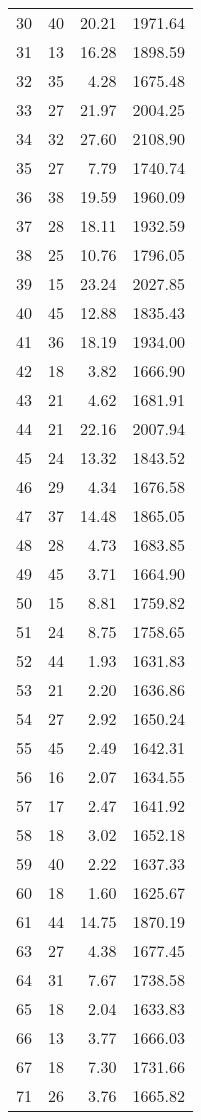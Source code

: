 \begin{appendix}
\begin{longtable}{rrrr}
30 & 40 & 20.21 & 1971.64 \\
31 & 13 & 16.28 & 1898.59 \\
32 & 35 & 4.28 & 1675.48 \\
33 & 27 & 21.97 & 2004.25 \\
34 & 32 & 27.60 & 2108.90 \\
35 & 27 & 7.79 & 1740.74 \\
36 & 38 & 19.59 & 1960.09 \\
37 & 28 & 18.11 & 1932.59 \\
38 & 25 & 10.76 & 1796.05 \\
39 & 15 & 23.24 & 2027.85 \\
40 & 45 & 12.88 & 1835.43 \\
41 & 36 & 18.19 & 1934.00 \\
42 & 18 & 3.82 & 1666.90 \\
43 & 21 & 4.62 & 1681.91 \\
44 & 21 & 22.16 & 2007.94 \\
45 & 24 & 13.32 & 1843.52 \\
46 & 29 & 4.34 & 1676.58 \\
47 & 37 & 14.48 & 1865.05 \\
48 & 28 & 4.73 & 1683.85 \\
49 & 45 & 3.71 & 1664.90 \\
50 & 15 & 8.81 & 1759.82 \\
51 & 24 & 8.75 & 1758.65 \\
52 & 44 & 1.93 & 1631.83 \\
53 & 21 & 2.20 & 1636.86 \\
54 & 27 & 2.92 & 1650.24 \\
55 & 45 & 2.49 & 1642.31 \\
56 & 16 & 2.07 & 1634.55 \\
57 & 17 & 2.47 & 1641.92 \\
58 & 18 & 3.02 & 1652.18 \\
59 & 40 & 2.22 & 1637.33 \\
60 & 18 & 1.60 & 1625.67 \\
61 & 44 & 14.75 & 1870.19 \\
63 & 27 & 4.38 & 1677.45 \\
64 & 31 & 7.67 & 1738.58 \\
65 & 18 & 2.04 & 1633.83 \\
66 & 13 & 3.77 & 1666.03 \\
67 & 18 & 7.30 & 1731.66 \\
71 & 26 & 3.76 & 1665.82 \\
\bottomrule
\end{longtable}


\end{appendix}
